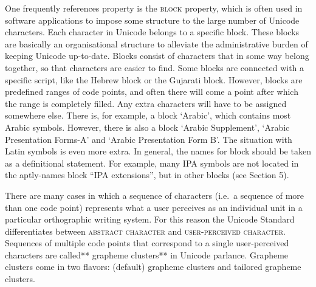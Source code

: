 {{{{{{{{{{{{{{One frequently references property is the \textsc{block} property, which is often used in software applications to impose some structure to the large number of Unicode characters. Each character in Unicode belongs to a specific block. These blocks are basically an organisational structure to alleviate the administrative burden of keeping Unicode up-to-date. Blocks consist of characters that in some way belong together, so that characters are easier to find. Some blocks are connected with a specific script, like the Hebrew block or the Gujarati block. However, blocks are predefined ranges of code points, and often there will come a point after which the range is completely filled. Any extra characters will have to be assigned somewhere else. There is, for example, a block `Arabic', which contains most Arabic symbols. However, there is also a block `Arabic Supplement', `Arabic Presentation Forms-A' and `Arabic Presentation Form B'. The situation with Latin symbols is even more extra. In general, the names for block should be taken as a definitional statement. For example, many IPA symbols are not located in the aptly-names block ``IPA extensions'', but in other blocks (see Section 5).

There are many cases in which a sequence of characters (i.e.~a sequence of more than one code point) represents what a user perceives as an individual unit in a particular orthographic writing system. For this reason the Unicode Standard differentiates between \textsc{abstract character} and \textsc{user-perceived character}. Sequences of multiple code points that correspond to a single user-perceived characters are called** grapheme clusters** in Unicode parlance. Grapheme clusters come in two flavors: (default) grapheme clusters and tailored grapheme clusters.

}}}}}}}}}}}}}}
